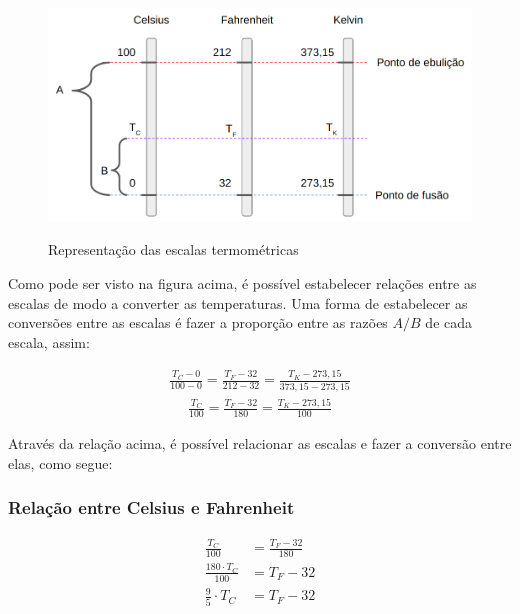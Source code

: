 \begin{figure}[!h]
    \caption{Representação das escalas termométricas}
    
    \centering %
    \includegraphics[width=12cm]{Pictures/FISICA_EM/TERMOLOGIA/escalas_termometros.png} %
    \label{figura:qualquernome}
\end{figure}

Como pode ser visto na figura acima, é possível estabelecer relações entre as escalas de modo a converter as temperaturas. Uma forma de estabelecer as conversões entre as escalas é fazer a proporção entre as razões $A/B$ de cada escala, assim:

\begin{ceqn}
\begin{align*}
    \frac{T_C - 0}{100 - 0} = \frac{T_F - 32}{212 - 32} = \frac{T_K-273,15}{373,15 - 273,15}
\end{align*}
\begin{align*}
    \frac{T_C}{100} = \frac{T_F - 32}{180} = \frac{T_K-273,15}{100}
\end{align*}
\end{ceqn}

Através da relação acima, é possível relacionar as escalas e fazer a conversão entre elas, como segue:

\subsubsection{Relação entre Celsius e Fahrenheit}
\begin{ceqn}
    \begin{align*}
        \frac{T_C}{100} &= \frac{T_F - 32}{180} \\
        \frac{180 \cdot T_C}{100} &= T_F -32 \\
        \frac{9}{5} \cdot T_C &= T_F-32 \\
    \end{align*}
\end{ceqn}

